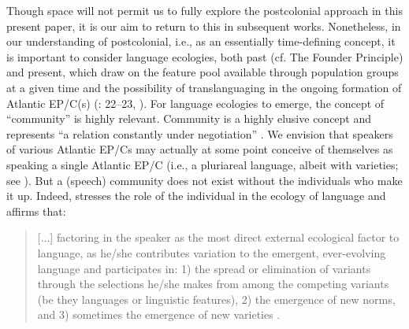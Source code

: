 \documentclass[output=paper,colorlinks,citecolor=brown]{langscibook}
\begin{document}
Though space will not permit us to fully explore the postcolonial approach in this present paper, it is our aim to return to this in subsequent works. Nonetheless, in our understanding of postcolonial, i.e., as an essentially time-defining concept, it is important to consider language ecologies, both past (cf. The Founder Principle) and present, which draw on the feature pool available through population groups at a given time and the possibility of translanguaging in the ongoing formation of Atlantic EP/C(s) (\cite{Haugen_1971,Mufwene_1996,Mufwene_2013,Schneider_2007}: 22--23, \cite{Garcia_Li_2014}). For language ecologies to emerge, the concept of “community” is highly relevant. Community is a highly elusive concept \citep[xii]{Muhleisen_2017} and represents “a relation constantly under negotiation” \citep[2]{Brydon_DonaldColeman_2008}. We envision that speakers of various Atlantic EP/Cs may actually at some point conceive of themselves as speaking a single Atlantic EP/C (i.e., a pluriareal language, albeit with varieties; see ). But a (speech) community does not exist without the individuals who make it up. Indeed, \citet[323]{Mufwene_2013} stresses the role of the individual in the ecology of language and affirms that:

\begin{quote}
    [...] factoring in the speaker as the most direct external ecological factor to language, as he/she contributes variation to the emergent, ever-evolving language and participates in: 1) the spread or elimination of variants through the selections he/she makes from among the competing variants (be they languages or linguistic features), 2) the emergence of new norms, and 3) sometimes the emergence of new varieties \citep[311]{Mufwene_2013}.
\end{quote}
\end{document}
